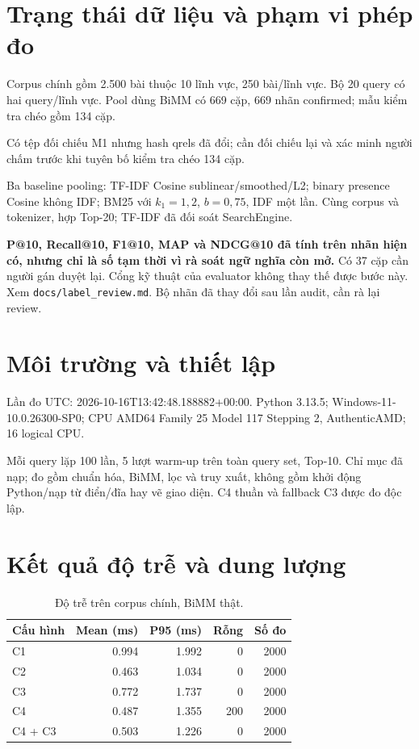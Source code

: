 
\section{Trạng thái dữ liệu và phạm vi phép đo}

Corpus chính gồm 2.500 bài thuộc 10 lĩnh vực, 250 bài/lĩnh vực. Bộ 20 query có hai query/lĩnh vực. Pool dùng BiMM có 669 cặp, 669 nhãn confirmed; mẫu kiểm tra chéo gồm 134 cặp.

Có tệp đối chiếu M1 nhưng hash qrels đã đổi; cần đối chiếu lại và xác minh người chấm trước khi tuyên bố kiểm tra chéo 134 cặp.

Ba baseline pooling: TF-IDF Cosine sublinear/smoothed/L2; binary presence Cosine không IDF; BM25 với $k_1=1{,}2$, $b=0{,}75$, IDF một lần. Cùng corpus và tokenizer, hợp Top-20; TF-IDF đã đối soát SearchEngine.

\textbf{P@10, Recall@10, F1@10, MAP và NDCG@10 đã tính trên nhãn hiện có, nhưng chỉ là số tạm thời vì rà soát ngữ nghĩa còn mở.} Có 37 cặp cần người gán duyệt lại. Cổng kỹ thuật của evaluator không thay thế được bước này. Xem \texttt{docs/label\_review.md}. Bộ nhãn đã thay đổi sau lần audit, cần rà lại review.

\section{Môi trường và thiết lập}

Lần đo UTC: 2026-10-16T13:42:48.188882+00:00. Python 3.13.5; Windows-11-10.0.26300-SP0; CPU AMD64 Family 25 Model 117 Stepping 2, AuthenticAMD; 16 logical CPU.

Mỗi query lặp 100 lần, 5 lượt warm-up trên toàn query set, Top-10. Chỉ mục đã nạp; đo gồm chuẩn hóa, BiMM, lọc và truy xuất, không gồm khởi động Python/nạp từ điển/đĩa hay vẽ giao diện. C4 thuần và fallback C3 được đo độc lập.

\section{Kết quả độ trễ và dung lượng}

\begin{table}[htbp]
\centering
\begin{tabular}{|l|r|r|r|r|}
\hline
Cấu hình & Mean (ms) & P95 (ms) & Rỗng & Số đo \\
\hline
C1 & 0.994 & 1.992 & 0 & 2000 \\
C2 & 0.463 & 1.034 & 0 & 2000 \\
C3 & 0.772 & 1.737 & 0 & 2000 \\
C4 & 0.487 & 1.355 & 200 & 2000 \\
C4 + C3 & 0.503 & 1.226 & 0 & 2000 \\
\hline
\end{tabular}
\caption{Độ trễ trên corpus chính, BiMM thật.}
\end{table}

